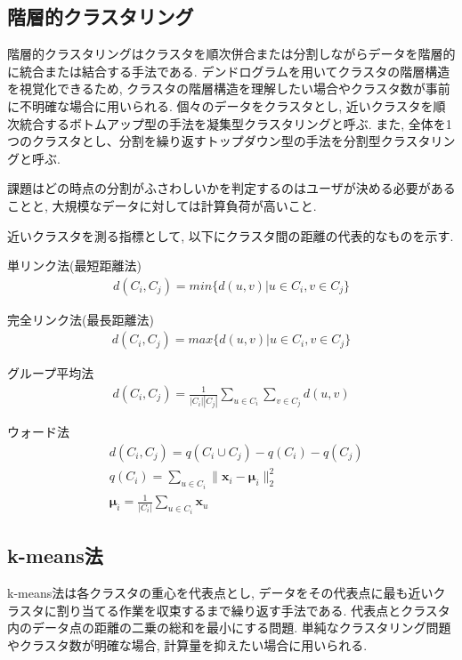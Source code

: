 \documentclass[dvipdfmx, 10pt]{jsarticle}
\begin{document}
\subsection*{階層的クラスタリング}
階層的クラスタリングはクラスタを順次併合または分割しながらデータを階層的に統合または結合する手法である. 
デンドログラムを用いてクラスタの階層構造を視覚化できるため, 
クラスタの階層構造を理解したい場合やクラスタ数が事前に不明確な場合に用いられる. 
個々のデータをクラスタとし, 近いクラスタを順次統合するボトムアップ型の手法を凝集型クラスタリングと呼ぶ. 
また, 全体を1つのクラスタとし、分割を繰り返すトップダウン型の手法を分割型クラスタリングと呼ぶ. 

課題はどの時点の分割がふさわしいかを判定するのはユーザが決める必要があることと, 大規模なデータに対しては計算負荷が高いこと. 

近いクラスタを測る指標として, 以下にクラスタ間の距離の代表的なものを示す. 

\begin{oframed}
    単リンク法(最短距離法)
    \begin{align*}
        d(C_i, C_j) = min\{d(u,v) | u \in C_i, v \in C_j\}
    \end{align*}

    完全リンク法(最長距離法)
    \begin{align*}
        d(C_i, C_j) = max\{d(u,v) | u \in C_i, v \in C_j\}
    \end{align*}

    グループ平均法
    \begin{align*}
        d(C_i, C_j) = \frac{1}{|C_i||C_j|} \sum_{u \in C_i} \sum_{v \in C_j} d(u,v) 
    \end{align*}

    ウォード法
    \begin{align*}
        & d(C_i, C_j) = q(C_i \cup C_j) - q(C_i) - q(C_j) \\
        & q(C_i) = \sum_{u \in C_i} \|\mathbf{x}_i - \mathbf{\mu}_i\|_2^2 \\
        & \mathbf{\mu}_i = \frac{1}{|C_i|} \sum_{u \in C_i} \mathbf{x}_u
    \end{align*}
\end{oframed}

\subsection*{k-means法}
k-means法は各クラスタの重心を代表点とし, データをその代表点に最も近いクラスタに割り当てる作業を収束するまで繰り返す手法である. 
代表点とクラスタ内のデータ点の距離の二乗の総和を最小にする問題. 
単純なクラスタリング問題やクラスタ数が明確な場合, 計算量を抑えたい場合に用いられる. 
\end{document}
